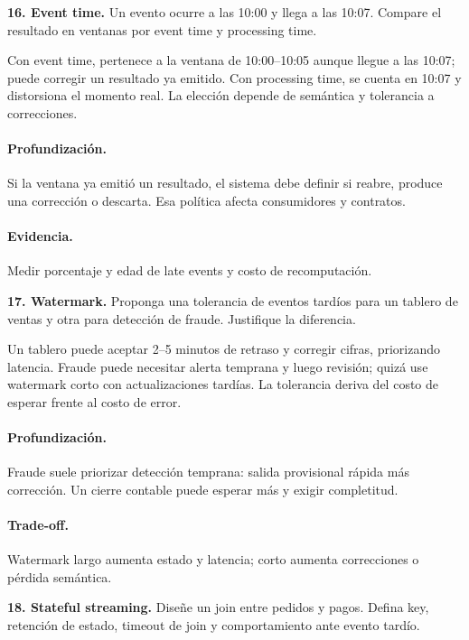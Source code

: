 \documentclass[variant=guiaresuelta,cover=institutional,mode=screen]{ua-engineering-v6-article}
\begin{document}
\begin{uaexercise}
\textbf{16. Event time.} Un evento ocurre a las 10:00 y llega a las 10:07. Compare el resultado en ventanas por event time y processing time.
\end{uaexercise}
\begin{uaanswer}
Con event time, pertenece a la ventana de 10:00--10:05 aunque llegue a las 10:07; puede corregir un resultado ya emitido. Con processing time, se cuenta en 10:07 y distorsiona el momento real. La elección depende de semántica y tolerancia a correcciones.

\paragraph{Profundización.} Si la ventana ya emitió un resultado, el sistema debe definir si reabre, produce una corrección o descarta. Esa política afecta consumidores y contratos.\paragraph{Evidencia.} Medir porcentaje y edad de late events y costo de recomputación.
\end{uaanswer}
\begin{uaexercise}
\textbf{17. Watermark.} Proponga una tolerancia de eventos tardíos para un tablero de ventas y otra para detección de fraude. Justifique la diferencia.
\end{uaexercise}
\begin{uaanswer}
Un tablero puede aceptar 2--5 minutos de retraso y corregir cifras, priorizando latencia. Fraude puede necesitar alerta temprana y luego revisión; quizá use watermark corto con actualizaciones tardías. La tolerancia deriva del costo de esperar frente al costo de error.

\paragraph{Profundización.} Fraude suele priorizar detección temprana: salida provisional rápida más corrección. Un cierre contable puede esperar más y exigir completitud.\paragraph{Trade-off.} Watermark largo aumenta estado y latencia; corto aumenta correcciones o pérdida semántica.
\end{uaanswer}
\begin{uaexercise}
\textbf{18. Stateful streaming.} Diseñe un join entre pedidos y pagos. Defina key, retención de estado, timeout de join y comportamiento ante evento tardío.
\end{uaexercise}
\end{document}
